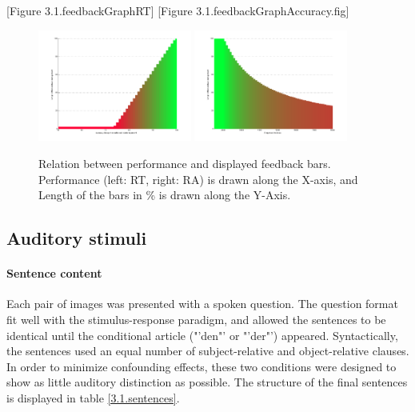 [Figure 3.1.feedbackGraphRT] [Figure 3.1.feedbackGraphAccuracy.fig]
\begin{figure}[h]
\begin{center}
\vspace{7mm}
\includegraphics[width=0.45\textwidth]{pics/3_1_feedbackGraphAccuracy}
\includegraphics[width=0.45\textwidth]{pics/3_1_feedbackGraphRT}
\caption{\label{3.1.feedbackGraphs} Relation between performance and displayed feedback bars. Performance (left: RT, right: RA) is drawn along the X-axis, and Length of the bars in \% is drawn along the Y-Axis.}
\end{center}
\end{figure}

\subsection{Auditory stimuli}

\paragraph{Sentence content}
Each pair of images was presented with a spoken question.
The question format fit well with the stimulus-response paradigm, and allowed the sentences to be identical until the conditional article ("'den"' or "'der"') appeared.
Syntactically, the sentences used an equal number of subject-relative and object-relative clauses.
In order to minimize confounding effects, these two conditions were designed to show as little auditory distinction as possible.
The structure of the final sentences is displayed in table \ref{3.1.sentences}.

